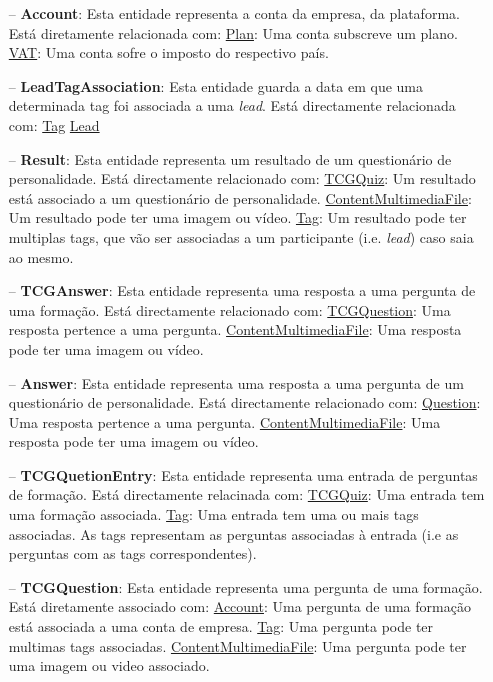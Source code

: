 \begin{itemize}
	\item[--] \textbf{Account}: Esta entidade representa a conta da empresa, da plataforma. Está diretamente relacionada com:
		\subitem \underline{Plan}: Uma conta subscreve um plano.
		\subitem \underline{VAT}: Uma conta sofre o imposto do respectivo país.
	\item[--] \textbf{LeadTagAssociation}: Esta entidade guarda a data em que uma determinada tag foi associada a uma \textit{lead}. Está directamente relacionada com:
		\subitem \underline{Tag}
		\subitem \underline{Lead}
	\item[--] \textbf{Result}: Esta entidade representa um resultado de um questionário de personalidade. Está directamente relacionado com:
		\subitem \underline{TCGQuiz}: Um resultado está associado a um questionário de personalidade.
		\subitem \underline{ContentMultimediaFile}: Um resultado pode ter uma imagem ou vídeo.
		\subitem \underline{Tag}: Um resultado pode ter multiplas tags, que vão ser associadas a um participante (i.e. \textit{lead}) caso saia ao mesmo.
	\item[--] \textbf{TCGAnswer}: Esta entidade representa uma resposta a uma pergunta de uma formação. Está directamente relacionado com:
		\subitem \underline{TCGQuestion}: Uma resposta pertence a uma pergunta.
		\subitem \underline{ContentMultimediaFile}: Uma resposta pode ter uma imagem ou vídeo.
	\item[--] \textbf{Answer}: Esta entidade representa uma resposta a uma pergunta de um questionário de personalidade. Está directamente relacionado com:
		\subitem \underline{Question}: Uma resposta pertence a uma pergunta.
		\subitem \underline{ContentMultimediaFile}: Uma resposta pode ter uma imagem ou vídeo.
	\item[--] \textbf{TCGQuetionEntry}: Esta entidade representa uma entrada de perguntas de formação. Está directamente relacinada com:
		\subitem \underline{TCGQuiz}: Uma entrada tem uma formação associada.
		\subitem \underline{Tag}: Uma entrada tem uma ou mais tags associadas. As tags representam as perguntas associadas à entrada (i.e as perguntas com as tags correspondentes).
	\item[--] \textbf{TCGQuestion}: Esta entidade representa uma pergunta de uma formação. Está diretamente associado com:
		\subitem \underline{Account}: Uma pergunta de uma formação está associada a uma conta de empresa.
		\subitem \underline{Tag}: Uma pergunta pode ter multimas tags associadas.
		\subitem \underline{ContentMultimediaFile}: Uma pergunta pode ter uma imagem ou video associado.

\end{itemize}
